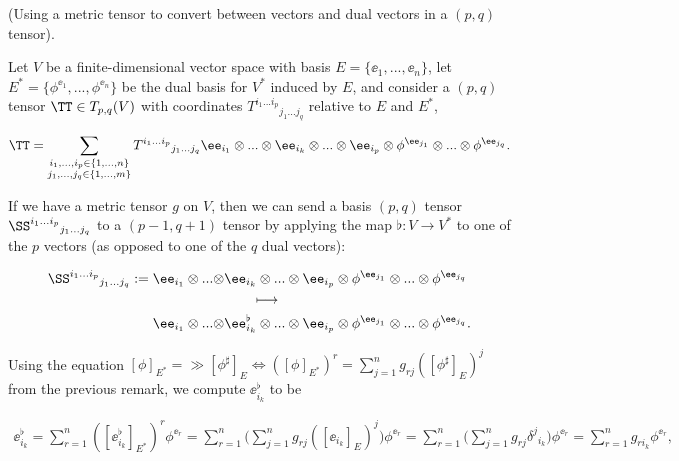 \begin{deriv}
    (Using a metric tensor to convert between vectors and dual vectors in a $(p, q)$ tensor).
    
    Let $V$ be a finite-dimensional vector space with basis $E = \{\ee_1, ..., \ee_n\}$, let $E^* = \{\phi^{\ee_1}, ..., \phi^{\ee_n}\}$ be the dual basis for $V^*$ induced by $E$, and consider a $(p, q)$ tensor $\TT \in T_{p,q}(V)$ with coordinates $T^{i_1 ... i_p}{}_{j_1 ... j_q}$ relative to $E$ and $E^*$,

    \begin{align*}
        \TT = \sum_{\substack{i_1, ..., i_p \in \{1, ..., n\} \\ j_1, ..., j_q \in \{1, ..., m\}}} T^{i_1 ... i_p}{}_{j_1 ... j_q} \ee_{i_1} \otimes ... \otimes \ee_{i_k} \otimes ... \otimes \ee_{i_p} \otimes \phi^{\ee_{j_1}} \otimes ... \otimes \phi^{\ee_{j_q}}.
    \end{align*}

    If we have a metric tensor $g$ on $V$, then we can send a basis $(p, q)$ tensor $\SS^{i_1 ... i_p}{}_{j_1 ... j_q}$ to a $(p - 1, q + 1)$ tensor by applying the map $\flat:V \rightarrow V^*$ to one of the $p$ vectors (as opposed to one of the $q$ dual vectors): 
    
    \begin{align*}
        \SS^{i_1 ... i_p}{}_{j_1 ... j_q} := \ee_{i_1} \otimes ... \otimes &\ee_{i_k} \otimes ... \otimes \ee_{i_p} \otimes \phi^{\ee_{j_1}} \otimes ... \otimes \phi^{\ee_{j_q}} \\
        &\qquad \longmapsto \\
        \ee_{i_1} \otimes ... \otimes &\ee_{i_k}^\flat \otimes ... \otimes \ee_{i_p} \otimes \phi^{\ee_{j_1}} \otimes ... \otimes \phi^{\ee_{j_q}}.
    \end{align*}
    
    Using the equation $[\phi]_{E^*} = \gg [\phi^\sharp]_E \iff ([\phi]_{E^*})^r = \sum_{j = 1}^n g_{rj} ([\phi^\sharp]_E)^j$ from the previous remark, we compute $\ee_{i_k}^\flat$ to be 
    
    \begin{align*}
        \ee_{i_k}^\flat = \sum_{r = 1}^n ([\ee_{i_k}^\flat]_{E^*})^r \phi^{\ee_r} =
        \sum_{r = 1}^n \Big( \sum_{j = 1}^n g_{rj} ([\ee_{i_k}]_E)^j \Big) \phi^{\ee_r} = \sum_{r = 1}^n \Big( \sum_{j = 1}^n g_{rj} \delta^j{}_{i_k} \Big) \phi^{\ee_r}
        = \sum_{r = 1}^n g_{r i_k} \phi^{\ee_r},
    \end{align*}
    

\end{deriv}
